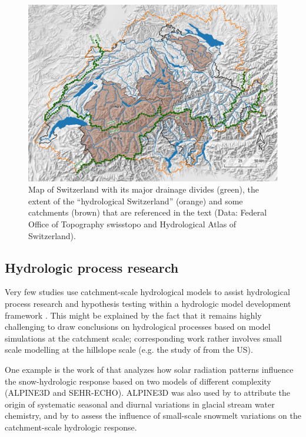 \documentclass[10pt,a4paper]{article}
\begin{document}
\begin{figure}[htb]
	\begin{center}
		\includegraphics[width=0.95\columnwidth]{figures/map}
		\caption{{Map of Switzerland with its major drainage divides (green), the extent
				of the ``hydrological Switzerland'' (orange) and some catchments (brown)
				that are referenced in the text (Data: Federal Office of Topography
				swisstopo and Hydrological Atlas of Switzerland). 
				\label{fig:map}
		}}
	\end{center}
\end{figure}

\subsection{Hydrologic process research}
\label{sec:application:process}

Very few studies use catchment-scale hydrological models to assist
hydrological process research and hypothesis testing within a hydrologic
model development framework \citep{clarkOpinion2016}. This might be explained
by the fact that it remains highly challenging to draw conclusions on
hydrological processes based on model simulations at the catchment
scale; corresponding work rather involves small scale modelling at the
hillslope scale (e.g. the study of \citealt{Heuvel2018} from the US). 

One example is the work of \citet{Comola2017} that analyzes how solar
radiation patterns influence the snow-hydrologic response based on two
models of different complexity (ALPINE3D and SEHR-ECHO). ALPINE3D was
also used by \citet{Hindshaw2011} to attribute the origin of systematic
seasonal and diurnal variations in glacial stream water chemistry, and
by \citet{Brauchli2017} to assess the influence of small-scale snowmelt
variations on the catchment-scale hydrologic response.
\end{document}
